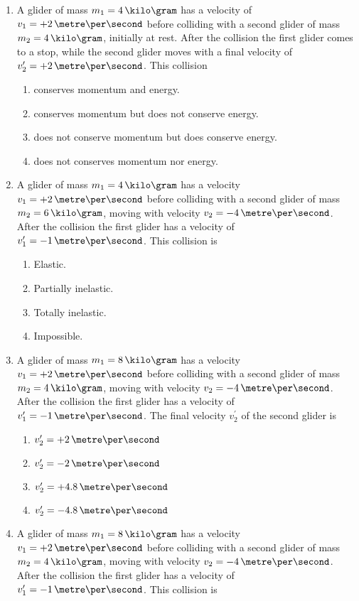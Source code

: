 \begin{enumerate}
\item A glider of mass $m_1 = 4\,\kilo\gram$ has a velocity of $v_1 = +2\,\metre\per\second$ before colliding with a second glider of mass $m_2 = 4\,\kilo\gram$, initially at rest. After the collision the first glider comes to a stop, while the second glider moves with a final velocity of $v_2^\prime = +2\,\metre\per\second$. This collision
  \begin{enumerate}
  \item conserves momentum and energy.
  \item conserves momentum but does not conserve energy.
  \item does not conserve momentum but does conserve energy.
  \item does not conserves momentum nor energy.
  \end{enumerate}
\item  A glider of mass $m_1 = 4\,\kilo\gram$ has a velocity $v_1 = +2\,\metre\per\second$ before colliding with a second glider of mass $m_2 = 6\,\kilo\gram$, moving with velocity $v_2 = -4\,\metre\per\second$.  After the collision the first glider has a velocity of $v_1^\prime = -1\,\metre\per\second$. This collision is
  \begin{enumerate}
  \item Elastic.
  \item Partially inelastic.
  \item Totally inelastic.
  \item Impossible.
  \end{enumerate}
\item  A glider of mass $m_1 = 8\,\kilo\gram$ has a velocity $v_1 = +2\,\metre\per\second$ before colliding with a second glider of mass $m_2 = 4\,\kilo\gram$, moving with velocity $v_2 = -4\,\metre\per\second$.  After the collision the first glider has a velocity of $v_1^\prime = -1\,\metre\per\second$. The final velocity $v_2^\prime$ of the second glider is
  \begin{enumerate}
  \item $v_2^\prime = +2\,\metre\per\second$
  \item $v_2^\prime = -2\,\metre\per\second$
  \item $v_2^\prime = +4.8\,\metre\per\second$
  \item $v_2^\prime = -4.8\,\metre\per\second$
  \end{enumerate}
\item  A glider of mass $m_1 = 8\,\kilo\gram$ has a velocity $v_1 = +2\,\metre\per\second$ before colliding with a second glider of mass $m_2 = 4\,\kilo\gram$, moving with velocity $v_2 = -4\,\metre\per\second$.  After the collision the first glider has a velocity of $v_1^\prime = -1\,\metre\per\second$. This collision is

\end{enumerate}
